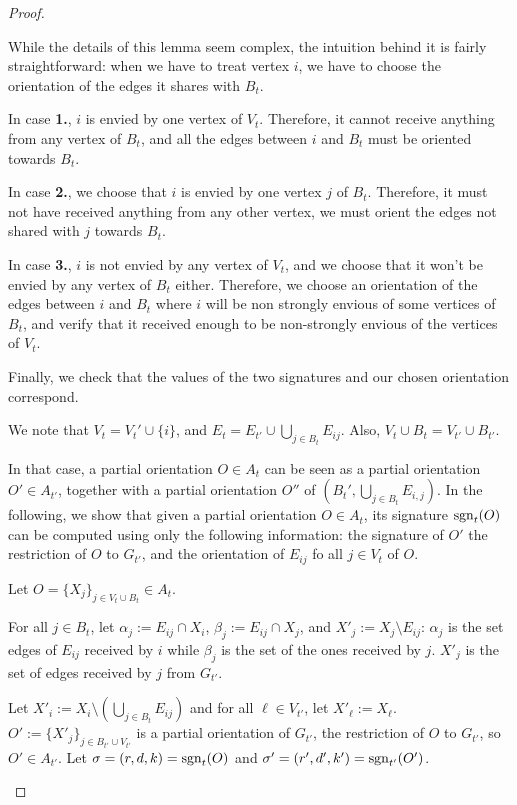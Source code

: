 \begin{proof}
\begin{lemma}
    \end{lemma}

    While the details of this lemma seem complex, the intuition behind it is fairly straightforward: when we have to treat vertex $i$, we have to choose the orientation of the edges it shares with $B_t$.

    In case \textbf{1.}, $i$ is envied by one vertex of $V_t$. Therefore, it cannot receive anything from any vertex of $B_t$, and all the edges between $i$ and $B_t$ must be oriented towards $B_t$.

    In case \textbf{2.}, we choose that $i$ is envied by one vertex $j$ of $B_t$. Therefore, it must not have received anything from any other vertex, we must orient the edges not shared with $j$ towards $B_t$.

    In case \textbf{3.}, $i$ is not envied by any vertex of $V_t$, and we choose that it won't be envied by any vertex of $B_t$ either. Therefore, we choose an orientation of the edges between $i$ and $B_t$ where $i$ will be non strongly envious of some vertices of $B_t$, and verify that it received enough to be non-strongly envious of the vertices of $V_t$.

    Finally, we check that the values of the two signatures and our chosen orientation correspond.

    \begin{nestedproof}
        We note that $V_t=V_t'\cup \{i\}$, and $E_t=E_{t'}\cup \bigcup_{j\in B_t} E_{ij}$. Also, $V_t\cup B_t=V_{t'}\cup B_{t'}$.

        In that case, a partial orientation $O\in A_t$ can be seen as a partial orientation $O'\in A_{t'}$, together with a partial orientation $O''$ of $(B_t',\bigcup_{j\in B_t} E_{i,j})$. In the following, we show that given a partial orientation $O\in A_t$, its signature $\operatorname{sgn}_t(O)$ can be computed using only the following information: the signature of $O'$ the restriction of $O$ to $G_{t'}$, and the orientation of $E_{ij}$ fo all $j\in V_t$ of $O$.

        Let $O=\{X_j\}_{j\in V_t\cup B_t}\in A_t$.

        For all $j\in B_t$, let $\alpha_j:=E_{ij}\cap X_i$, $\beta_j:=E_{ij}\cap X_j$, and $X'_j:=X_j\setminus E_{ij}$: $\alpha_j$ is the set edges of $E_{ij}$ received by $i$ while $\beta_j$ is the set of the ones received by $j$. $X'_j$ is the set of edges received by $j$ from $G_{t'}$.

        Let $X'_i:=X_i\setminus (\bigcup_{j\in B_t}E_{ij})$ and for all $\ell\in V_{t'}$, let $X'_\ell:=X_\ell$.  $O':= \{X'_j\}_{j\in B_{t'}\cup V_{t'}}$ is a partial orientation of $G_{t'}$, the restriction of $O$ to $G_{t'}$, so $O'\in A_{t'}$. Let $\sigma=(r,d,k)=\operatorname{sgn}_t(O)$ and $\sigma'=(r',d',k')=\operatorname{sgn}_{t'}(O')$.


\end{nestedproof}
\end{proof}
